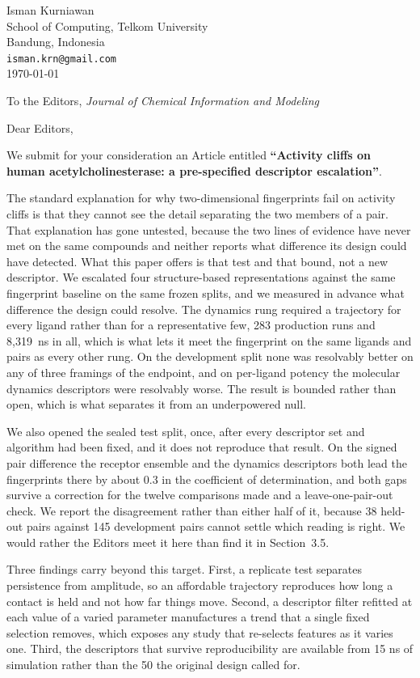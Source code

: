 \documentclass[11pt,letterpaper]{article}
\begin{document}
\noindent
Isman Kurniawan \\
School of Computing, Telkom University \\
Bandung, Indonesia \\
\texttt{isman.krn@gmail.com} \\[0.4em]
\today

\medskip
\noindent
To the Editors, \emph{Journal of Chemical Information and Modeling}

\medskip
\noindent
Dear Editors,

We submit for your consideration an Article entitled \textbf{``Activity cliffs on human
acetylcholinesterase: a pre-specified descriptor escalation''}.

The standard explanation for why two-dimensional fingerprints fail on activity cliffs
is that they cannot see the detail separating the two members of a pair. That
explanation has gone untested, because the two lines of evidence have never met on the
same compounds and neither reports what difference its design could have detected. What
this paper offers is that test and that bound, not a new descriptor. We escalated four structure-based representations against
the same fingerprint baseline on the same frozen splits, and we measured in advance
what difference the design could resolve. The dynamics rung required a trajectory for
every ligand rather than for a representative few, 283 production runs and 8{,}319~ns
in all, which is what lets it meet the fingerprint on the same ligands and pairs as
every other rung. On the development split none was resolvably
better on any of three framings of the endpoint, and on per-ligand potency the
molecular dynamics descriptors were resolvably worse. The result is bounded rather than open, which is what separates it
from an underpowered null.

We also opened the sealed test split, once, after every descriptor set and algorithm
had been fixed, and it does not reproduce that result. On the signed pair difference the
receptor ensemble and the dynamics descriptors both lead the fingerprints there by
about 0.3 in the coefficient of determination, and both gaps survive a correction for
the twelve comparisons made and a leave-one-pair-out check. We report the disagreement
rather than either half of it, because 38 held-out pairs against 145 development pairs
cannot settle which reading is right. We would rather the Editors meet it here than
find it in Section~3.5.

Three findings carry beyond this target. First, a replicate test separates persistence
from amplitude, so an affordable trajectory reproduces how long a contact is held and
not how far things move. Second, a descriptor filter refitted at
each value of a varied parameter manufactures a trend that a single fixed selection
removes, which exposes any study that re-selects features as it varies one.
Third, the descriptors that survive reproducibility are available from 15 ns of
simulation rather than the 50 the original design called for.
\end{document}
